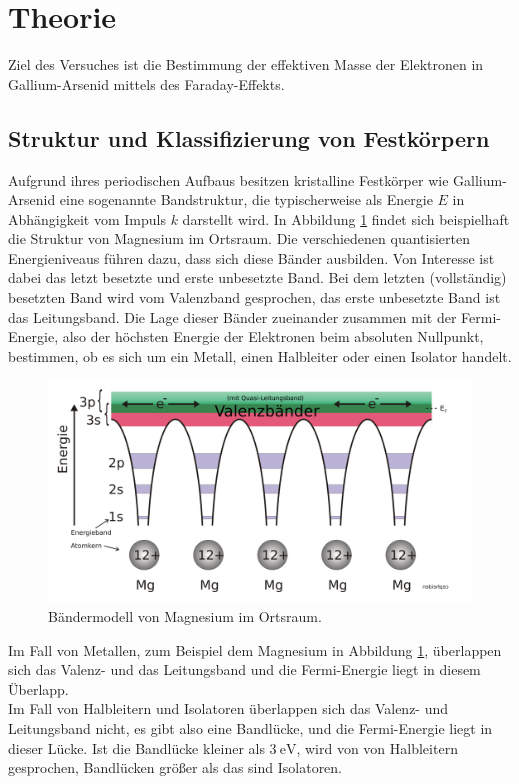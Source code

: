 \section{Theorie}
\label{sec:Theorie}

Ziel des Versuches ist die Bestimmung der effektiven Masse der Elektronen in Gallium-Arsenid mittels des Faraday-Effekts.

\subsection{Struktur und Klassifizierung von Festkörpern}

Aufgrund ihres periodischen Aufbaus besitzen kristalline Festkörper wie Gallium-Arsenid eine sogenannte Bandstruktur, die typischerweise als Energie $E$ in Abhängigkeit vom Impuls $k$ darstellt wird.
In Abbildung \ref{fig:magnesium}
findet sich beispielhaft die Struktur von Magnesium im Ortsraum. Die verschiedenen quantisierten Energieniveaus führen dazu, dass sich diese Bänder ausbilden. Von Interesse ist dabei das letzt besetzte und erste unbesetzte Band.
Bei dem letzten (vollständig) besetzten Band wird vom Valenzband gesprochen, das erste unbesetzte Band ist das Leitungsband. Die Lage dieser Bänder zueinander zusammen mit der Fermi-Energie, also der höchsten Energie der Elektronen
beim absoluten Nullpunkt, bestimmen, ob es sich um ein Metall, einen Halbleiter oder einen Isolator handelt.

\begin{figure}[H]
    \centering
    \includegraphics[width=\textwidth]{Bilder/Bändermodell-Potentialtöpfe-Mg.svg.png}
    \caption{Bändermodell von Magnesium im Ortsraum. \cite{magnesium} }
    \label{fig:magnesium}
\end{figure}

Im Fall von Metallen, zum Beispiel dem Magnesium in Abbildung \ref{fig:magnesium},
überlappen sich das Valenz- und das Leitungsband und die Fermi-Energie liegt in diesem Überlapp. \\
Im Fall von Halbleitern und Isolatoren überlappen sich das Valenz- und Leitungsband nicht, es gibt also eine Bandlücke, und die Fermi-Energie liegt in dieser Lücke. Ist die Bandlücke kleiner als $\qty{3}{\electronvolt}$, wird von von Halbleitern gesprochen,
Bandlücken größer als das sind Isolatoren. \\

